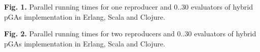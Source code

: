 %
%
%
%

\begin{small}


\textbf{Fig. 1.} Parallel running times for one reproducer and 0..30 evaluators of hybrid pGAs implementation in Erlang, Scala and Clojure.

\end{small}


\begin{small}


\textbf{Fig. 2.} Parallel running times for two reproducers and 0..30 evaluators of hybrid pGAs implementation in Erlang, Scala and Clojure.

\end{small}


%     

%     


%    
%
%
%    
%


